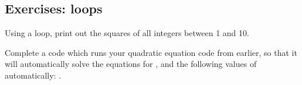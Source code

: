 \subsection{Exercises: loops}

\begin{hightask}
Using a loop, print out the squares of all integers between 1 and 10.
\end{hightask}

\begin{hightask}
	Complete a code which runs your quadratic equation code from earlier, so that it will automatically solve the equations for ,  and the following values of  automatically: .
\end{hightask}